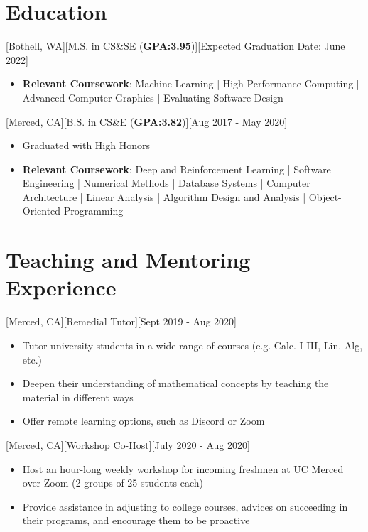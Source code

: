 \documentclass{article}
\begin{document}
\section{Education}
[Bothell, WA][M.S. in CS\&SE (\textbf{GPA:3.95})][Expected Graduation Date: June 2022]
\begin{itemize}
	\item \textbf{Relevant Coursework}: Machine Learning | High Performance Computing | Advanced Computer Graphics | Evaluating Software Design
\end{itemize}
[Merced, CA][B.S. in CS\&E (\textbf{GPA:3.82})][Aug 2017 - May 2020]
\begin{itemize}
  \item Graduated with High Honors 
  \item \textbf{Relevant Coursework}: Deep and Reinforcement Learning | Software Engineering | Numerical Methods | Database Systems | Computer Architecture | Linear Analysis | Algorithm Design and Analysis | Object-Oriented Programming
\end{itemize}

\section{Teaching and Mentoring Experience }
[Merced, CA][Remedial Tutor][Sept 2019 - Aug 2020]
\begin{itemize}
  \item Tutor university students in a wide range of courses (e.g. Calc. I-III, Lin. Alg, etc.)
  \item Deepen their understanding of mathematical concepts by teaching the material in different ways
  \item Offer remote learning options, such as Discord or Zoom
\end{itemize}
[Merced, CA][Workshop Co-Host][July 2020 - Aug 2020]
\begin{itemize}
  \item Host an hour-long weekly workshop for incoming freshmen at UC Merced over Zoom (2 groups of 25 students each)
  \item Provide assistance in adjusting to college courses, advices on succeeding in their programs, and encourage them to be proactive
\end{itemize}
\end{document}

